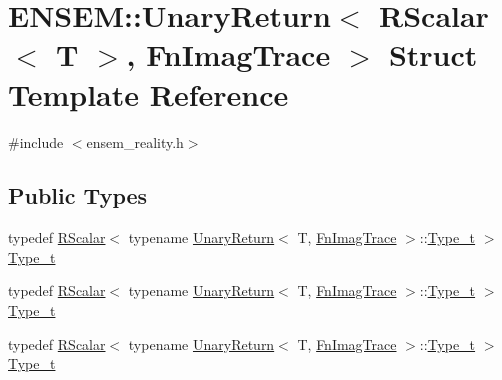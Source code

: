 \hypertarget{structENSEM_1_1UnaryReturn_3_01RScalar_3_01T_01_4_00_01FnImagTrace_01_4}{}\section{E\+N\+S\+EM\+:\+:Unary\+Return$<$ R\+Scalar$<$ T $>$, Fn\+Imag\+Trace $>$ Struct Template Reference}
\label{structENSEM_1_1UnaryReturn_3_01RScalar_3_01T_01_4_00_01FnImagTrace_01_4}


{\ttfamily \#include $<$ensem\+\_\+reality.\+h$>$}

\subsection*{Public Types}
\begin{DoxyCompactItemize}
\item 
typedef \mbox{\hyperlink{classENSEM_1_1RScalar}{R\+Scalar}}$<$ typename \mbox{\hyperlink{structENSEM_1_1UnaryReturn}{Unary\+Return}}$<$ T, \mbox{\hyperlink{structENSEM_1_1FnImagTrace}{Fn\+Imag\+Trace}} $>$\+::\mbox{\hyperlink{structENSEM_1_1UnaryReturn_3_01RScalar_3_01T_01_4_00_01FnImagTrace_01_4_ade2d3556f547d545e7db88cb51393a3d}{Type\+\_\+t}} $>$ \mbox{\hyperlink{structENSEM_1_1UnaryReturn_3_01RScalar_3_01T_01_4_00_01FnImagTrace_01_4_ade2d3556f547d545e7db88cb51393a3d}{Type\+\_\+t}}
\item 
typedef \mbox{\hyperlink{classENSEM_1_1RScalar}{R\+Scalar}}$<$ typename \mbox{\hyperlink{structENSEM_1_1UnaryReturn}{Unary\+Return}}$<$ T, \mbox{\hyperlink{structENSEM_1_1FnImagTrace}{Fn\+Imag\+Trace}} $>$\+::\mbox{\hyperlink{structENSEM_1_1UnaryReturn_3_01RScalar_3_01T_01_4_00_01FnImagTrace_01_4_ade2d3556f547d545e7db88cb51393a3d}{Type\+\_\+t}} $>$ \mbox{\hyperlink{structENSEM_1_1UnaryReturn_3_01RScalar_3_01T_01_4_00_01FnImagTrace_01_4_ade2d3556f547d545e7db88cb51393a3d}{Type\+\_\+t}}
\item 
typedef \mbox{\hyperlink{classENSEM_1_1RScalar}{R\+Scalar}}$<$ typename \mbox{\hyperlink{structENSEM_1_1UnaryReturn}{Unary\+Return}}$<$ T, \mbox{\hyperlink{structENSEM_1_1FnImagTrace}{Fn\+Imag\+Trace}} $>$\+::\mbox{\hyperlink{structENSEM_1_1UnaryReturn_3_01RScalar_3_01T_01_4_00_01FnImagTrace_01_4_ade2d3556f547d545e7db88cb51393a3d}{Type\+\_\+t}} $>$ \mbox{\hyperlink{structENSEM_1_1UnaryReturn_3_01RScalar_3_01T_01_4_00_01FnImagTrace_01_4_ade2d3556f547d545e7db88cb51393a3d}{Type\+\_\+t}}
\end{DoxyCompactItemize}



